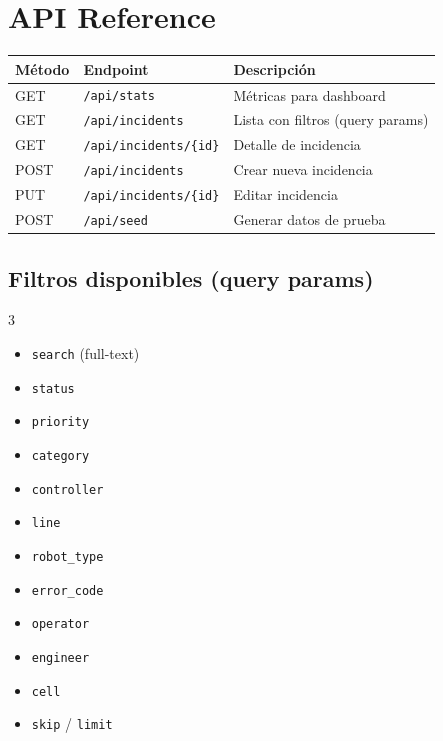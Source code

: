 \documentclass[11pt,a4paper]{article}
\begin{document}
\section{API Reference}

\begin{center}
\begin{tabularx}{\textwidth}{llX}
\toprule
\textbf{Método} & \textbf{Endpoint} & \textbf{Descripción} \\
\midrule
GET & \texttt{/api/stats} & Métricas para dashboard \\
GET & \texttt{/api/incidents} & Lista con filtros (query params) \\
GET & \texttt{/api/incidents/\{id\}} & Detalle de incidencia \\
POST & \texttt{/api/incidents} & Crear nueva incidencia \\
PUT & \texttt{/api/incidents/\{id\}} & Editar incidencia \\
POST & \texttt{/api/seed} & Generar datos de prueba \\
\bottomrule
\end{tabularx}
\end{center}

\subsection{Filtros disponibles (query params)}

\begin{multicols}{3}
\begin{itemize}[noitemsep]
    \item \texttt{search} (full-text)
    \item \texttt{status}
    \item \texttt{priority}
    \item \texttt{category}
    \item \texttt{controller}
    \item \texttt{line}
    \item \texttt{robot\_type}
    \item \texttt{error\_code}
    \item \texttt{operator}
    \item \texttt{engineer}
    \item \texttt{cell}
    \item \texttt{skip} / \texttt{limit}
\end{itemize}
\end{multicols}
\end{document}
